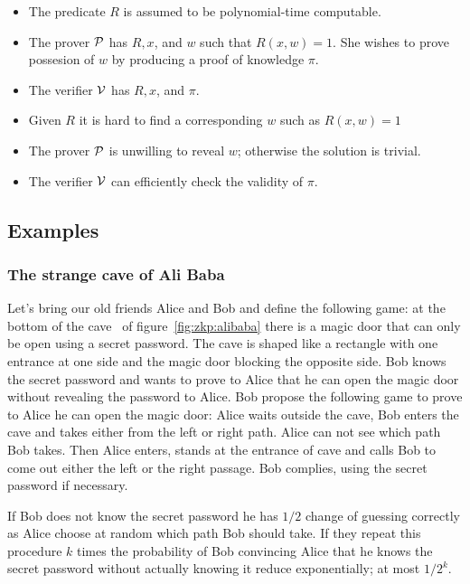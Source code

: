 \begin{itemize}
  \item The predicate $R$ is assumed to be polynomial-time computable.
  \item The prover $\mathcal{P}$ has $R,x$, and $w$ such that $R(x,w) = 1$. She wishes to prove possesion of $w$ by producing a proof of knowledge $\pi$.
  \item The verifier $\mathcal{V}$ has $R,x$, and $\pi$.
  \item Given $R$ it is hard to find a corresponding $w$ such as $R(x,w) = 1$
  \item The prover $\mathcal{P}$ is unwilling to reveal $w$; otherwise the solution is trivial.
  \item The verifier $\mathcal{V}$ can efficiently check the validity of $\pi$.
\end{itemize}

\subsection{Examples}

\subsubsection{The strange cave of Ali Baba}
\label{zkp:examples}

Let's bring our old friends Alice and Bob and define the following game: at the bottom of the cave~\cite{Quisquater:1989:EZP:118209.118269} of figure~\ref{fig:zkp:alibaba} there is a magic door that
can only be open using a secret password. The cave is shaped like a rectangle with one entrance at one side and the magic door blocking the opposite side. Bob knows the secret password and wants to prove to Alice that he can open the magic door without revealing the password to Alice.
Bob propose the following game to prove to Alice he can open the magic door: Alice waits outside the cave, Bob enters the cave and
takes either from the left or right path. Alice can not see which path Bob takes. Then Alice enters, stands at the entrance of cave and calls
Bob to come out either the left or the right passage. Bob complies, using the secret password if necessary.

If Bob does not know the secret password he has $1/2$ change of guessing correctly as Alice choose at random which path Bob should take. If they repeat this procedure $k$ times the probability of Bob convincing Alice that he knows the secret password without actually knowing it reduce exponentially; at most $1/2^{k}$.

